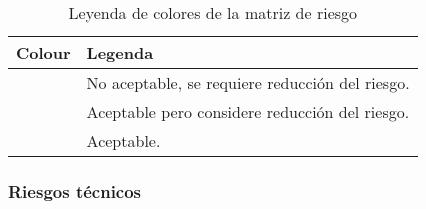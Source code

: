 \begin{table}[h!]
    \centering
    \begin{tabular}{|p{2cm}|p{10cm}|}
        \hline \bf Colour & \bf Legenda \\
        \hline \cellcolor{red} & No aceptable, se requiere reducción del riesgo. \\ [10pt]
        \hline \cellcolor{yellow} & Aceptable pero considere reducción del riesgo. \\[10pt]
        \hline \cellcolor{green} & Aceptable. \\ [10pt]
        \hline
    \end{tabular}
    \caption{Leyenda de colores de la matriz de riesgo}
\end{table}


\flushleft \subsubsection{Riesgos técnicos}

